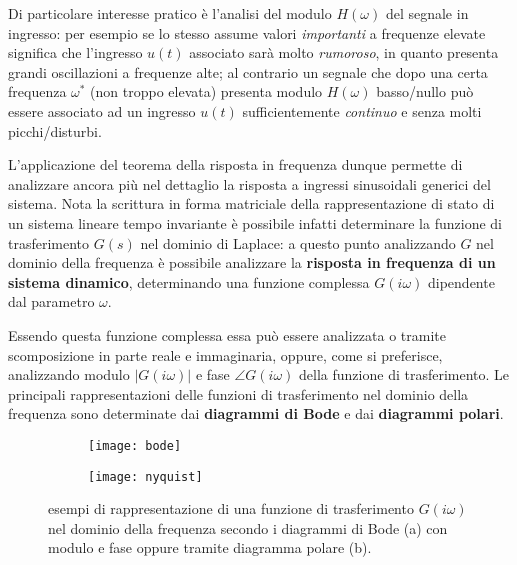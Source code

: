 		Di particolare interesse pratico è l'analisi del modulo $H(\omega)$ del segnale in ingresso: per esempio se lo stesso assume valori \textit{importanti} a frequenze elevate significa che l'ingresso $u(t)$ associato sarà molto \textit{rumoroso}, in quanto presenta grandi oscillazioni a frequenze alte; al contrario un segnale che dopo una certa frequenza $\omega^*$ (non troppo elevata) presenta modulo $H(\omega)$ basso/nullo può essere associato ad un ingresso $u(t)$ sufficientemente \textit{continuo} e senza molti picchi/disturbi.
			
		\vspace{3mm}
		
		\begin{concetto}
			L'applicazione del teorema della risposta in frequenza dunque permette di analizzare ancora più nel dettaglio la risposta a ingressi sinusoidali generici del sistema. Nota la scrittura  in forma matriciale della rappresentazione di stato di un sistema lineare tempo invariante è possibile infatti determinare la funzione di trasferimento $G(s)$ nel dominio di Laplace: a questo punto analizzando $G$ nel dominio della frequenza è possibile analizzare la \textbf{risposta in frequenza di un sistema dinamico}, determinando una funzione complessa $G(i\omega)$ dipendente dal parametro $\omega$.
		\end{concetto}
		
		Essendo questa funzione complessa essa può essere analizzata o tramite scomposizione in parte reale e immaginaria, oppure, come si preferisce, analizzando modulo $|G(i\omega)|$ e fase $\angle G(i\omega)$ della funzione di trasferimento. Le principali rappresentazioni delle funzioni di trasferimento nel dominio della frequenza sono determinate dai \textbf{diagrammi di Bode} e dai \textbf{diagrammi polari}.
			
			
		\begin{figure}[bht]
			\centering
			\begin{subfigure}{0.48\linewidth}
				\centering \texttt{[image: bode]} \caption{}
			\end{subfigure}
			\begin{subfigure}{0.48\linewidth}
				\centering \texttt{[image: nyquist]} \caption{}
			\end{subfigure}
			\caption{esempi di rappresentazione di una funzione di trasferimento $G(i\omega)$ nel dominio della frequenza secondo i diagrammi di Bode (a) con modulo e fase oppure tramite diagramma polare (b).}
			\label{fig:lti:bodenyquist}
		\end{figure}
		

